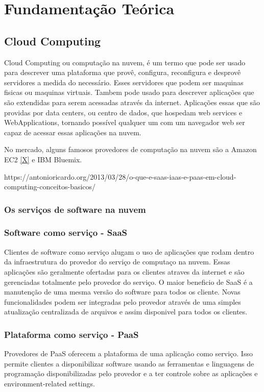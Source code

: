 \chapter{Fundamentação Teórica}
\section{Cloud Computing}
	Cloud Computing ou computação na nuvem, é um termo que pode ser usado para descrever uma plataforma que provê, configura, reconfigura e desprovê servidores a medida do necessário. Esses servidores que podem ser maquinas fisicas ou maquinas virtuais. Tambem pode usado para descrever aplicações que são extendidas para serem acessadas através da internet. Aplicações essas que são providas por data centers, ou centro de dados, que hospedam web services e WebApplications, tornando possível qualquer um com um navegador web ser capaz de acessar essas aplicações na nuvem.
	
	No mercado, alguns famosos provedores de computação na nuvem são a Amazon EC2 \ref{X} e IBM Bluemix.
	
	https://antonioricardo.org/2013/03/28/o-que-e-saas-iaas-e-paas-em-cloud-computing-conceitos-basicos/

\subsection{Os serviços de software na nuvem}
		
\subsection{Software como serviço - SaaS}
	Clientes de software como serviço alugam o uso de aplicações que rodam dentro da infraestrutura do provedor do serviço de computaço na nuvem. Essas aplicações são geralmente ofertadas para os clientes atraves da internet e são gerenciadas totalmente pelo provedor do serviço. O maior beneficio de SaaS é a manutenção de uma mesma versão do software para todos os cliente. Novas funcionalidades podem ser integradas pelo provedor através de uma simples atualização centralizada de arquivos e assim disponivel para todos os clientes.


\subsection{Plataforma como serviço - PaaS}
	Provedores de PaaS oferecem a plataforma de uma aplicação como serviço. Isso permite clientes a disponibilizar software usando as ferramentas e linguagens de programação disponibilizadas pelo provedor e a ter controle sobre as aplicações e environment-related settings.

